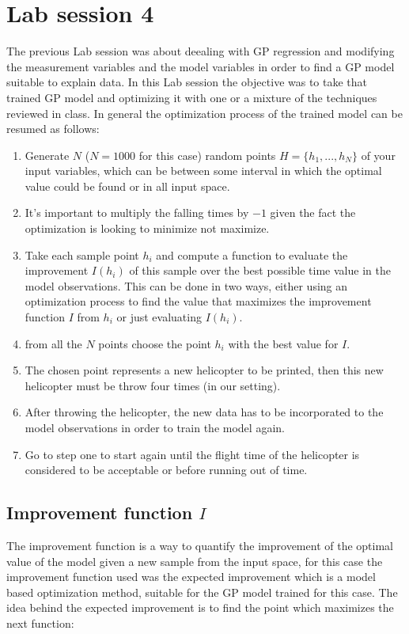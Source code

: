 \section{Lab session 4}

The previous Lab session was about deealing with GP regression and modifying the measurement variables and the model variables in order to find a GP model suitable to explain data. In this Lab session the objective was to take that trained GP model and optimizing it with one or a mixture of the techniques reviewed in class. In general the optimization process of the trained model can be resumed as follows:

\begin{enumerate}
	\item Generate $N$ ($N = 1000$ for this case) random points $H = \{ h_1,...,h_N \}$ of your input variables, which can be between some interval in which the optimal value could be found or in all input space.
	\item It's important to multiply the falling times by $-1$ given the fact the optimization is looking to minimize not maximize.
	\item Take each sample point $h_i$ and compute a function to evaluate the improvement $I(h_i)$ of this sample over the best possible time value in the model observations. This can be done in two ways, either using an optimization process to find the value that maximizes the improvement function $I$ from $h_i$ or just evaluating $I(h_i)$.
	\item from all the $N$ points choose the point $h_i$ with the best value for $I$.
	\item The chosen point represents a new helicopter to be printed, then this new helicopter must be throw four times (in our setting).
	\item After throwing the helicopter, the new data has to be incorporated to the model observations in order to train the model again.
	\item Go to step one to start again until the flight time of the helicopter is considered to be acceptable or before running out of time.
\end{enumerate}

\subsection{Improvement function $I$}

The improvement function is a way to quantify the improvement of the optimal value of the model given a new sample from the input space, for this case the improvement function used was the expected improvement which is a model based optimization method, suitable for the GP model trained for this case. The idea behind the expected improvement is to find the point which maximizes the next function:

